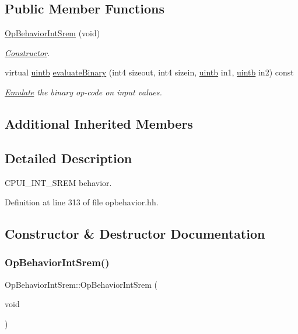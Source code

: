 \subsection*{Public Member Functions}
\begin{DoxyCompactItemize}
\item 
\mbox{\hyperlink{class_op_behavior_int_srem_a0763e0b705ad098f5b40b2ddb26bc1aa}{Op\+Behavior\+Int\+Srem}} (void)
\begin{DoxyCompactList}\small\item\em \mbox{\hyperlink{class_constructor}{Constructor}}. \end{DoxyCompactList}\item 
virtual \mbox{\hyperlink{types_8h_a2db313c5d32a12b01d26ac9b3bca178f}{uintb}} \mbox{\hyperlink{class_op_behavior_int_srem_a6e65683da3dc1c0dbdf5d138519a9d85}{evaluate\+Binary}} (int4 sizeout, int4 sizein, \mbox{\hyperlink{types_8h_a2db313c5d32a12b01d26ac9b3bca178f}{uintb}} in1, \mbox{\hyperlink{types_8h_a2db313c5d32a12b01d26ac9b3bca178f}{uintb}} in2) const
\begin{DoxyCompactList}\small\item\em \mbox{\hyperlink{class_emulate}{Emulate}} the binary op-\/code on input values. \end{DoxyCompactList}\end{DoxyCompactItemize}
\subsection*{Additional Inherited Members}


\subsection{Detailed Description}
C\+P\+U\+I\+\_\+\+I\+N\+T\+\_\+\+S\+R\+EM behavior. 

Definition at line 313 of file opbehavior.\+hh.



\subsection{Constructor \& Destructor Documentation}
\mbox{\label{class_op_behavior_int_srem_a0763e0b705ad098f5b40b2ddb26bc1aa}} 
\subsubsection{\texorpdfstring{OpBehaviorIntSrem()}{OpBehaviorIntSrem()}}
{\footnotesize\ttfamily Op\+Behavior\+Int\+Srem\+::\+Op\+Behavior\+Int\+Srem (\begin{DoxyParamCaption}\item[{void}]{ }\end{DoxyParamCaption})\hspace{0.3cm}{\ttfamily [inline]}}



